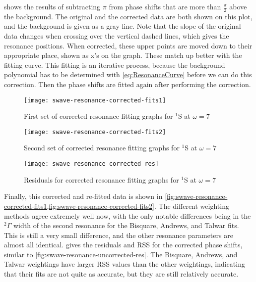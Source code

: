 \documentclass[Dissertation.tex]{subfiles}
\begin{document}
 shows the results of subtracting $\pi$ from 
phase shifts that are more than $\frac{\pi}{2}$ above the background. The 
original and the corrected data are both shown on this plot, and the 
background is given as a gray line. Note that the slope of the original data 
changes when crossing over the vertical dashed lines, which gives the 
resonance positions. When corrected, these upper points are moved down to 
their appropriate place, shown as x's on the graph. These match up better 
with the fitting curve. This fitting is an iterative process, because the 
background polynomial has to be determined with \cref{eq:ResonanceCurve} 
before we can do this correction. Then the phase shifts are fitted again 
after performing the correction.

\begin{figure}
	\centering
	\texttt{[image: swave-resonance-corrected-fits1]}
	\caption{First set of corrected resonance fitting graphs for $^1$S at $\omega = 7$}
	\label{fig:swave-resonance-corrected-fits1}
\end{figure}

\begin{figure}
	\centering
	\texttt{[image: swave-resonance-corrected-fits2]}
	\caption{Second set of corrected resonance fitting graphs for $^1$S at $\omega = 7$}
	\label{fig:swave-resonance-corrected-fits2}
\end{figure}

\begin{figure}
	\centering
	\texttt{[image: swave-resonance-corrected-res]}
	\caption{Residuals for corrected resonance fitting graphs for $^1$S at $\omega = 7$}
	\label{fig:swave-resonance-corrected-res}
\end{figure}

Finally, this corrected and re-fitted data is shown in
\cref{fig:swave-resonance-corrected-fits1,fig:swave-resonance-corrected-fits2}. The different 
weighting methods agree extremely well now, with the only notable differences 
being in the $^2\Gamma$ width of the second resonance for the Bisquare, 
Andrews, and Talwar fits. This is still a very small difference, and the 
other resonance parameters are almost all identical.
 gives the residuals and RSS for the corrected phase
shifts, similar to \cref{fig:swave-resonance-uncorrected-res}. The Bisquare, Andrews, 
and Talwar weightings have larger RSS values than the other weightings, 
indicating that their fits are not quite as accurate, but they are still 
relatively accurate.
\end{document}
